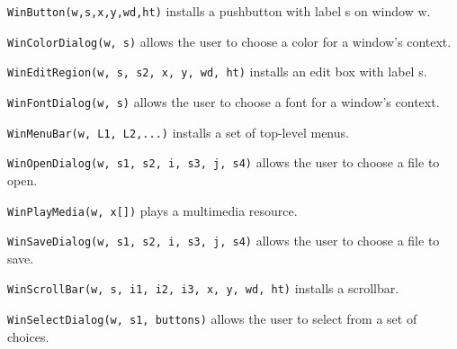 \texttt{WinButton(w,s,x,y,wd,ht)} installs a pushbutton with label s on window w.

\texttt{WinColorDialog(w, s)} allows the user to choose a color for a
window's context.

\texttt{WinEditRegion(w, s, s2, x, y, wd, ht)} installs an edit box with label s.

\texttt{WinFontDialog(w, s)} allows the user to choose a font for a
window's context.

\texttt{WinMenuBar(w, L1, L2,...)} installs a set of top-level menus.

\texttt{WinOpenDialog(w, s1, s2, i, s3, j, s4)} allows the user to
 choose a file to open.

\texttt{WinPlayMedia(w, x[])} plays a multimedia resource.

\texttt{WinSaveDialog(w, s1, s2, i, s3, j, s4)} allows the user to
 choose a file to save.

\texttt{WinScrollBar(w, s, i1, i2, i3, x, y, wd, ht)} installs a scrollbar.

\texttt{WinSelectDialog(w, s1, buttons)} allows the user to select from a set of
choices.

